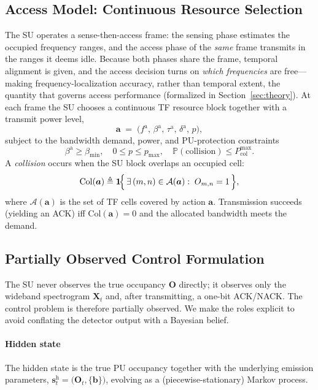 \documentclass[journal]{IEEEtran}
\newcommand{\Prob}{\mathbb{P}}
\newcommand{\Ind}{\mathbf{1}}             %
\newcommand{\defeq}{\triangleq}
\newcommand{\spec}{\bm{X}}                 %
\newcommand{\cell}{(m,n)}                  %
\newcommand{\boxk}{\bm{b}}                 %
\newcommand{\occ}{O}                       %
\newcommand{\occmap}{\bm{O}}               %
\newcommand{\act}{\bm{a}}                  %
\newcommand{\afc}{f^{\mathrm{a}}}          %
\newcommand{\aBW}{\beta^{\mathrm{a}}}      %
\newcommand{\ats}{\tau^{\mathrm{a}}}       %
\newcommand{\adur}{\delta^{\mathrm{a}}}    %
\newcommand{\pwr}{p}                       %
\newcommand{\pmax}{p_{\max}}               %
\newcommand{\dmin}{\beta_{\min}}           %
\newcommand{\Pcolmax}{P_{\mathrm{col}}^{\max}} %
\newcommand{\hidden}{\bm{s}^{\mathrm{h}}}   %
\begin{document}
\subsection{Access Model: Continuous Resource Selection}
\label{subsec:access}
The SU operates a sense-then-access frame: the sensing phase estimates the
occupied frequency ranges, and the access phase of the \emph{same} frame
transmits in the ranges it deems idle. Because both phases share the frame,
temporal alignment is given, and the access decision turns on \emph{which
frequencies} are free---making frequency-localization accuracy, rather than
temporal extent, the quantity that governs access performance (formalized in
Section~\ref{sec:theory}). At each frame the SU chooses a continuous TF
resource block together with a transmit power level,
\begin{equation}
\act \;=\; \bigl(\afc,\, \aBW,\, \ats,\, \adur,\, \pwr\bigr),
\label{eq:action}
\end{equation}
subject to the bandwidth demand, power, and PU-protection constraints
\begin{equation}
\aBW \ge \dmin, \quad 0 \le \pwr \le \pmax, \quad
\Prob(\text{collision}) \le \Pcolmax .
\label{eq:constraints}
\end{equation}
A \emph{collision} occurs when the SU block overlaps an occupied cell:
\begin{equation}
\mathrm{Col}(\act) \defeq
\Ind\!\Bigl\{\, \exists\,\cell \in \mathcal{A}(\act):\; \occ_{m,n}=1 \,\Bigr\},
\label{eq:collision}
\end{equation}
where $\mathcal{A}(\act)$ is the set of TF cells covered by action $\act$.
Transmission succeeds (yielding an ACK) iff $\mathrm{Col}(\act)=0$ and the
allocated bandwidth meets the demand.

\subsection{Partially Observed Control Formulation}
\label{subsec:pomdp}
The SU never observes the true occupancy $\occmap$ directly; it observes only
the wideband spectrogram $\spec_t$ and, after transmitting, a one-bit
ACK/NACK. The control problem is therefore partially observed. We make the
roles explicit to avoid conflating the detector output with a Bayesian
belief.

\paragraph*{Hidden state} The hidden state is the true PU occupancy together
with the underlying emission parameters,
$\hidden_t=\bigl(\occmap_t,\{\boxk\}\bigr)$, evolving as a
(piecewise-stationary) Markov process.
\end{document}

